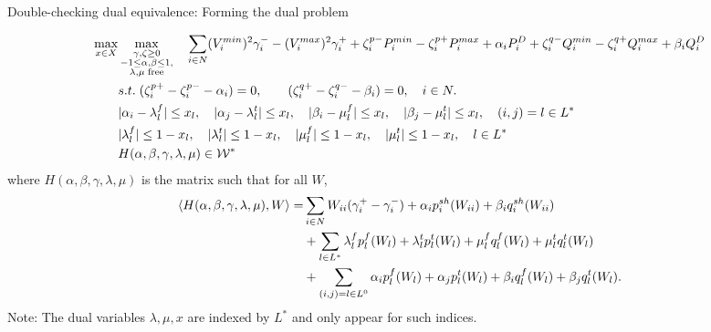 \documentclass[xcolor=dvipsnames]{beamer}
\newcommand{\ii}{i}
\newcommand{\llll}{l}
\newcommand{\WW}{W}
\newcommand{\WSet}{\mathcal{W}}
\begin{document}
\begin{frame}{Double-checking dual equivalence: Forming the dual problem}
\begin{tiny}
\begin{subequations}
\begin{align}
\max_{x \in X}& \max_{\substack{\gamma,\zeta \ge 0\\-1\le \alpha,\beta \le 1,\\ \lambda,\mu\; \text{free}}} \quad 
 \sum_{\ii \in N}  (V_\ii^{min})^2 \gamma_\ii^- - (V_\ii^{max})^2 \gamma_\ii^+ + \zeta_\ii^{p-}P_\ii^{min} - \zeta_\ii^{p+}P_\ii^{max} +\alpha_\ii P_\ii^D 
+ \zeta_\ii^{q-}Q_\ii^{min} - \zeta_\ii^{q+}Q_\ii^{max} + \beta_\ii Q_\ii^D \notag \\
&s.t.\; (\zeta_\ii^{p+}-\zeta_\ii^{p-} - \alpha_\ii) = 0, \qquad (\zeta_\ii^{q+}-\zeta_\ii^{q-} - \beta_\ii) = 0,\quad \ii \in N. \notag \\
& | \alpha_i -\lambda_\llll^f| \le x_l,\quad| \alpha_j - \lambda_l^t| \le x_l,\quad |\beta_i - \mu_l^f | \le x_l,\quad|\beta_j - \mu_l^t| \le x_l,\quad (i,j)=l \in L^* \notag \\
& |\lambda_l^f| \le 1-x_l,\quad |\lambda_l^t| \le 1-x_l,\quad|\mu_l^f| \le 1-x_l,\quad |\mu_l^t| \le 1-x_l,\quad l \in L^* \notag \\
& H(\alpha,\beta,\gamma,\lambda,\mu) \in \WSet^*\notag
\end{align}
\end{subequations}
where $H(\alpha,\beta,\gamma,\lambda,\mu)$ is the matrix such that for all $\WW$, 
\begin{align*}
\langle H(\alpha,\beta,\gamma,\lambda,\mu), W \rangle = &\sum_{\ii \in N} W_{\ii\ii}(\gamma_\ii^+-\gamma_\ii^-) + \alpha_\ii p_\ii^{sh}(\WW_{ii}) + \beta_\ii q_\ii^{sh}(\WW_{ii}) \\
&+ \sum_{l \in L^*} \lambda_l^f p_l^f(\WW_l) + \lambda_l^t p_l^t(\WW_l) + \mu_l^f q_l^f(\WW_l) + \mu_l^t q_l^t(\WW_l) \notag \\
&+ \sum_{(i,j)=l \in L^0} \alpha_i p_l^f(\WW_l) + \alpha_j p_l^t(\WW_l) + \beta_i q_l^f(\WW_l) + \beta_j q_l^t(\WW_l).
\end{align*}
Note: The dual variables $\lambda,\mu,x$ are indexed by $L^*$ and only appear for such indices.
\end{tiny}
\end{frame}
\end{document}
